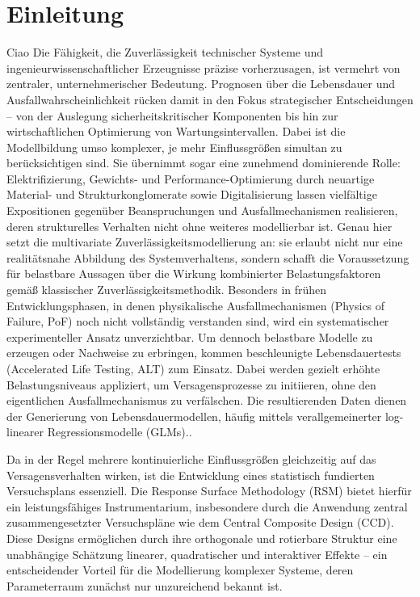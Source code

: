 
\chapter{Einleitung}
Ciao Die Fähigkeit, die Zuverlässigkeit technischer Systeme und ingenieurwissenschaftlicher Erzeugnisse präzise vorherzusagen, ist vermehrt von zentraler, unternehmerischer Bedeutung.
Prognosen über die Lebensdauer und Ausfallwahrscheinlichkeit rücken damit in den Fokus strategischer Entscheidungen – von der Auslegung sicherheitskritischer Komponenten bis hin zur wirtschaftlichen Optimierung von Wartungsintervallen. Dabei ist die Modellbildung umso komplexer, je mehr Einflussgrößen simultan zu berücksichtigen sind. Sie übernimmt sogar eine zunehmend dominierende Rolle: Elektrifizierung, Gewichts- und Performance-Optimierung durch neuartige Material- und Strukturkonglomerate sowie Digitalisierung lassen vielfältige Expositionen gegenüber Beanspruchungen und Ausfallmechanismen realisieren, deren strukturelles Verhalten nicht ohne weiteres modellierbar ist. Genau hier setzt die multivariate Zuverlässigkeitsmodellierung an: sie erlaubt nicht nur eine realitätsnahe Abbildung des Systemverhaltens, sondern schafft die Voraussetzung für belastbare Aussagen über die Wirkung kombinierter Belastungsfaktoren gemäß klassischer Zuverlässigkeitsmethodik. Besonders in frühen Entwicklungsphasen, in denen physikalische Ausfallmechanismen (Physics of Failure, PoF) noch nicht vollständig verstanden sind, wird ein systematischer experimenteller Ansatz unverzichtbar.  Um dennoch belastbare Modelle zu erzeugen oder Nachweise zu erbringen, kommen beschleunigte Lebensdauertests (Accelerated Life Testing, ALT) zum Einsatz. Dabei werden gezielt erhöhte Belastungsniveaus appliziert, um Versagensprozesse zu initiieren, ohne den eigentlichen Ausfallmechanismus zu verfälschen. Die resultierenden Daten dienen der Generierung von Lebensdauermodellen, häufig mittels verallgemeinerter log-linearer Regressionsmodelle (GLMs)..

Da in der Regel mehrere kontinuierliche Einflussgrößen gleichzeitig auf das Versagensverhalten wirken, ist die Entwicklung eines statistisch fundierten Versuchsplans essenziell. Die Response Surface Methodology (RSM) bietet hierfür ein leistungsfähiges Instrumentarium, insbesondere durch die Anwendung zentral zusammengesetzter Versuchspläne wie dem Central Composite Design (CCD). Diese Designs ermöglichen durch ihre orthogonale und rotierbare Struktur eine unabhängige Schätzung linearer, quadratischer und interaktiver Effekte – ein entscheidender Vorteil für die Modellierung komplexer Systeme, deren Parameterraum zunächst nur unzureichend bekannt ist.

